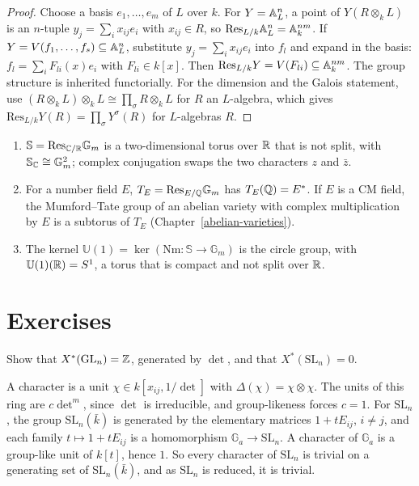 \begin{proof}
Choose a basis $e_1, \ldots, e_m$ of $L$ over $k$. For $Y = \mathbb{A}^n_L$, a point of $Y(R \otimes_kL)$ is an $n$-tuple $y_j = \sum_ix_{ij}e_i$ with $x_{ij} \in R$, so
$\mathrm{Res}_{L/k}\mathbb{A}^n_L = \mathbb{A}^{nm}_k$. If $Y = V(f_1, \ldots, f_s) \subseteq \mathbb{A}^n_L$, substitute $y_j = \sum_ix_{ij}e_i$ into $f_l$ and expand in the basis:
$f_l = \sum_iF_{li}(x)e_i$ with $F_{li} \in k[x]$. Then $\mathrm{Res}_{L/k}Y = V(F_{li}) \subseteq \mathbb{A}^{nm}_k$. The group structure is inherited functorially. For the dimension and the
Galois statement, use $(R \otimes_kL) \otimes_kL \cong \prod_\sigma R \otimes_kL$ for $R$ an $L$-algebra, which gives
$\mathrm{Res}_{L/k}Y(R) = \prod_\sigma Y^\sigma(R)$ for $L$-algebras $R$.
\end{proof}

\begin{example}\label{algebraic-groups:example-weil-restriction}
\begin{enumerate}
\item $\mathbb{S} = \mathrm{Res}_{\mathbb{C}/\mathbb{R}}\mathbb{G}_m$ is a two-dimensional torus over $\mathbb{R}$ that is not split, with $\mathbb{S}_{\mathbb{C}} \cong \mathbb{G}_m^2$; complex conjugation swaps the two
characters $z$ and $\bar z$.
\item For a number field $E$, $T_E = \mathrm{Res}_{E/\mathbb{Q}}\mathbb{G}_m$ has $T_E(\mathbb{Q}) = E^*$. If $E$ is a CM field, the Mumford--Tate group of an abelian variety with complex
multiplication by $E$ is a subtorus of $T_E$ (Chapter~\ref{abelian-varieties}).
\item The kernel $\mathbb{U}(1) = \ker(\mathrm{Nm} \colon \mathbb{S} \to \mathbb{G}_m)$ is the circle group, with $\mathbb{U}(1)(\mathbb{R}) = S^1$, a torus that is compact and not split over $\mathbb{R}$.
\end{enumerate}
\end{example}

\section{Exercises}\label{algebraic-groups:section-exercises}

\begin{exercise}\label{algebraic-groups:exercise-characters-gln}
Show that $X^*(\mathrm{GL}_n) = \mathbb{Z}$, generated by $\det$, and that $X^*(\mathrm{SL}_n) = 0$.
\end{exercise}

\begin{solution}
A character is a unit $\chi \in k[x_{ij}, 1/\det]$ with $\Delta(\chi) = \chi \otimes \chi$. The units of this ring are $c\det^m$, since $\det$ is irreducible, and group-likeness forces $c = 1$.
For $\mathrm{SL}_n$, the group $\mathrm{SL}_n(\bar k)$ is generated by the elementary matrices $1 + tE_{ij}$, $i \neq j$, and each family $t \mapsto 1 + tE_{ij}$ is a homomorphism
$\mathbb{G}_a \to \mathrm{SL}_n$. A character of $\mathbb{G}_a$ is a group-like unit of $k[t]$, hence $1$. So every character of $\mathrm{SL}_n$ is trivial on a generating set of
$\mathrm{SL}_n(\bar k)$, and as $\mathrm{SL}_n$ is reduced, it is trivial.
\end{solution}

